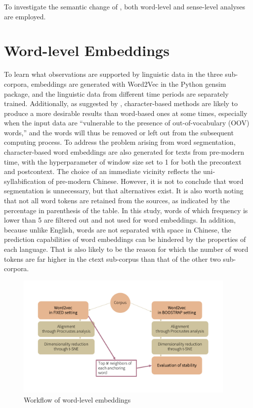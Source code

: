 To investigate the semantic change of \jia\rspace, both word-level and sense-level analyses are employed.

\section{Word-level Embeddings}
To learn what observations are supported by linguistic data in the three sub-corpora, embeddings are generated with Word2Vec in the Python gensim package, and the linguistic data from different time periods are separately trained. Additionally, as suggested by \textcite{li2019word}, character-based methods are likely to produce a more desirable results than word-based ones at some times, especially when the input data are ``vulnerable to the presence of out-of-vocabulary (OOV) words,'' and the words will thus be removed or left out from the subsequent computing process. To address the problem arising from word segmentation, character-based word embeddings are also generated for texts from pre-modern time, with the hyperparameter of window size set to 1 for both the precontext and postcontext. The choice of an immediate vicinity reflects the uni-syllabification of pre-modern Chinese. However, it is not to conclude that word segmentation is unnecessary, but that alternatives exist.  It is also worth noting that not all word tokens are retained from the sources, as indicated by the percentage in parenthesis of the table. In this study, words of which frequency is lower than 5 are filtered out and not used for word embeddings. In addition, because unlike English, words are not separated with space in Chinese, the prediction capabilities of word embeddings can be hindered by the properties of each language. That is also likely to be the reason for which the number of word tokens are far higher in the \gls{ctext} sub-corpus than that of the other two sub-corpora.

\begin{figure}[H]
  \centering
  \includegraphics[height=0.4\textheight,width=0.95\textwidth,keepaspectratio]{figures_new/from_slides/workflow_word_level.pdf}
  \caption{Workflow of word-level embeddings}
  \label{fig:workflow_word_level}
\end{figure}

